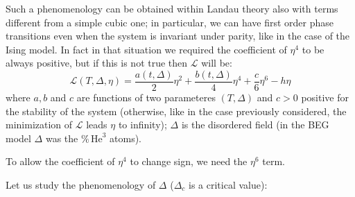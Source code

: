 \documentclass[../../Main/Main.tex]{subfiles}
\begin{document}
Such a phenomenology can be obtained within Landau theory also with terms different from a simple cubic one; in particular, we can have first order phase transitions even when the system is invariant under parity, like in the case of the Ising model. In fact in that situation we required the coefficient of \( \eta ^4 \) to be always positive, but if this is not true then \( \mathcal{L} \) will be:
\begin{equation}
  \mathcal{L} (T, \Delta, \eta ) = \frac{a (t,\Delta )}{2} \eta ^2 + \frac{b(t,\Delta )}{4} \eta ^4 + \frac{c}{6} \eta ^6 - h \eta
\end{equation}
where \( a,b \) and \( c \) are functions of two parameteres \( (T,\Delta ) \) and \( c>0 \) positive for the stability of the system (otherwise, like in the case previously considered, the minimization of \( \mathcal{L} \) leads \( \eta  \) to infinity); \( \Delta  \) is the disordered field (in the BEG model \( \Delta  \) was the \( \% \, \text{He}^3\) atoms).

\begin{remark}
To allow the coefficient of \( \eta ^4 \) to change sign, we need the \( \eta ^6 \) term.
\end{remark}



Let us study the phenomenology of \( \Delta  \) (\( \Delta _c \) is a critical value):
\end{document}
